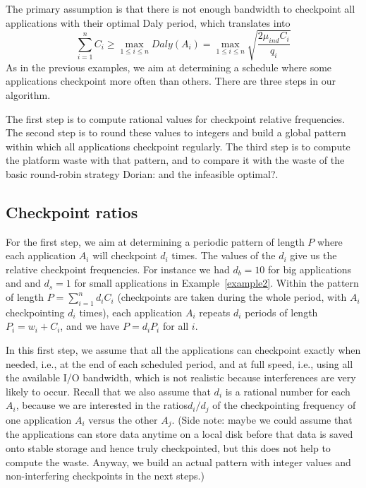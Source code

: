 \documentclass{article}
\newcommand{\ema}[1]{\ensuremath{#1}}
\newcommand{\Daly}{\ema{\mathit{Daly}}\xspace}
\newcommand{\dca}[1]{{\color{blue}Dorian: #1}}
\begin{document}
The primary assumption is that there is not enough bandwidth to checkpoint
all applications with their optimal Daly period, which translates into
$$\sum_{i=1}^{n} C_{i} \geq \max_{1 \leq i \leq n} \Daly(A_{i})  = \max_{1 \leq i \leq n} \sqrt{\frac{2 \mu_{ind} C_{i}}{q_{i}}}$$
As in the previous examples, we aim at determining a schedule where some applications checkpoint more often than others. There are three steps in our algorithm. 

The first step is to compute rational values for checkpoint relative frequencies. 
The second step is to round these values to integers and build a global pattern
within which all applications checkpoint regularly. The third step is to compute the platform
waste with that pattern, and to compare it with the waste of the  basic round-robin
strategy \dca{and the infeasible optimal?}.

\subsection{Checkpoint ratios}

For the first step, we  aim at determining
a periodic pattern of length $P$ where each application $A_{i}$ will checkpoint $d_{i}$ times.
The values of the $d_{i}$ give us the relative checkpoint frequencies. For instance we had
$d_{b} = 10$ for big applications and and $d_{s} = 1$ for small applications in Example~\ref{example2}.
Within the pattern of length $P  = \sum_{i=1}^{n} d_{i} C_{i}$ (checkpoints are taken during the 
whole period, with $A_{i}$ checkpointing $d_{i}$ times), 
each application $A_{i}$ repeats $d_{i}$ periods of length $P_{i} = w_{i}+C_{i}$,
and we have $P = d_{i} P_{i}$ for all $i$.

In this first step, we assume that all the applications can checkpoint exactly when needed, i.e.,
at the end of each scheduled period, and at full speed, i.e., using all the available I/O bandwidth,
which is not realistic because interferences are very likely to occur. 
Recall that we also assume that $d_{i}$ is a rational number for each $A_{i}$, because we are interested in the ratios$d_{i}/d_{j}$ of the checkpointing frequency of one application $A_{i}$ versus the other $A_{j}$. (Side note: maybe
we could assume that the applications can store data anytime on a local disk
before that data is saved onto stable storage and hence truly checkpointed, but this does not help
to compute the waste. Anyway, we build an actual pattern with integer values and non-interfering checkpoints in  the next steps.)
\end{document}
